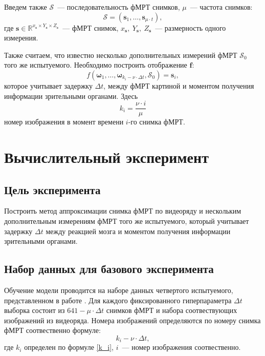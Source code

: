 \documentclass[12pt,twoside]{article}
\begin{document}
Введем также $\mathcal{S}$~--- последовательность фМРТ снимков,  $\mu$~--- частота снимков:
\begin{equation}
    \mathcal{S} = (\bm{s}_{1}, \dots, \bm{s}_{\mu \cdot t}),
\end{equation}
где $\bm{s} \in \mathbb{R}^{x_{\bm{s}} \times Y_{\bm{s}} \times Z_{\bm{s}}}$~--- фМРТ снимок, $x_{\bm{s}},~Y_{\bm{s}},~Z_{\bm{s}}$~--- размерность одного измерения.

Также считаем, что известно несколько дополнительных измерений фМРТ $\mathcal{S}_0$ того же испытуемого.
Необходимо построить отображение $\bm{f}$:
\begin{equation}
    {f}(\bm{\omega}_{1}, \dots, \bm{\omega}_{k_i - \nu \cdot \Delta t}, \mathcal{S}_0) = \bm{s}_i,
\end{equation}
которое учитывает задержку $\Delta t$, между фМРТ картиной и моментом получения информации зрительными органами.
Здесь
\begin{equation}
    \label{k_i}
    k_i = \dfrac{\nu \cdot i}{\mu}
\end{equation}
 номер изображения в момент времени $i$-го снимка фМРТ.
\section{Вычислительный эксперимент}
\subsection{Цель эксперимента}
Построить метод аппроксимации снимка фМРТ по видеоряду и нескольким дополнительным измерениям фМРТ того же испытуемого, который 
учитывает задержку $\Delta t$ между реакцией мозга и моментом получения информации зрительными органами. 
\subsection{Набор данных для базового эксперимента}
Обучение модели проводится на наборе данных четвертого испытуемого, представленном в работе \citep{Berezutskaya2022}. 
Для каждого фиксированного гиперпараметра $\Delta t$ выборка состоит из $641-\mu \cdot \Delta t$  снимков фМРТ и набора соотвествующих изображений из видеоряда. 
Номера изображений определяются по номеру снимка фМРТ соотвественно формуле:
\begin{equation}
    k_i - \nu \cdot \Delta t,
\end{equation}
где $k_i$ определен по формуле \eqref{k_i}, $i$~--- номер изображения соотвественно.
  
\end{document}
